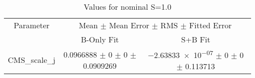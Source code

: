 \begin{table}
\centering
\caption{Values for nominal S=1.0}
\begin{tabular}{ccc}
\toprule
Parameter 	& \multicolumn{2}{c}{Mean $\pm$ Mean Error $\pm$ RMS $\pm$ Fitted Error}\\
 	& B-Only Fit & S+B Fit\\
\midrule
CMS\_scale\_j 	& \num{0.0966888} $\pm$ \num{0} $\pm$ \num{0} $\pm$ \num{0.0909269} 	& \num{-2.63833e-07} $\pm$ \num{0} $\pm$ \num{0} $\pm$ \num{0.113713}\\
\bottomrule
\end{tabular}
\end{table}